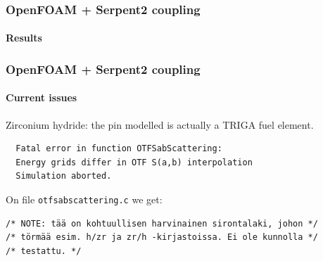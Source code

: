\documentclass[svgnames,smaller,table]{beamer}
\begin{document}
\begin{frame}
  \frametitle{OpenFOAM + Serpent2 coupling}
  \framesubtitle{Results}
  \begin{center}
    
  \end{center}
\end{frame}

\begin{frame}[fragile] %
  \frametitle{OpenFOAM + Serpent2 coupling}
  \framesubtitle{Current issues}
  \begin{center}
  Zirconium hydride: the pin modelled is actually a TRIGA fuel element.\\
\begin{verbatim}
  Fatal error in function OTFSabScattering:
  Energy grids differ in OTF S(a,b) interpolation
  Simulation aborted.
\end{verbatim}

On file \texttt{otfsabscattering.c} we get:

\begin{verbatim}
/* NOTE: tää on kohtuullisen harvinainen sirontalaki, johon */
/* törmää esim. h/zr ja zr/h -kirjastoissa. Ei ole kunnolla */
/* testattu. */
\end{verbatim}
  
  \end{center}
\end{frame}


\end{document}
